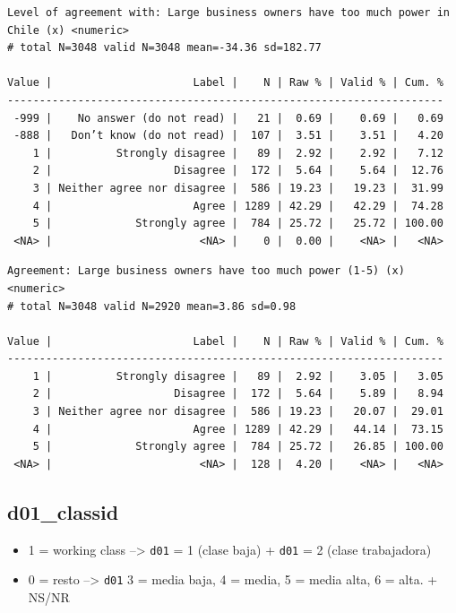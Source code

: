 \documentclass[
  letterpaper,
  DIV=11,
  numbers=noendperiod]{scrreprt}
\newenvironment{Shaded}{\begin{snugshade}}{\end{snugshade}}
\newcommand{\FunctionTok}[1]{\textcolor[rgb]{0.28,0.35,0.67}{#1}}
\newcommand{\NormalTok}[1]{\textcolor[rgb]{0.00,0.23,0.31}{#1}}
\newcommand{\SpecialCharTok}[1]{\textcolor[rgb]{0.37,0.37,0.37}{#1}}
\providecommand{\tightlist}{%
  \setlength{\itemsep}{0pt}\setlength{\parskip}{0pt}}
\begin{document}
\begin{verbatim}
Level of agreement with: Large business owners have too much power in Chile (x) <numeric> 
# total N=3048 valid N=3048 mean=-34.36 sd=182.77

Value |                      Label |    N | Raw % | Valid % | Cum. %
--------------------------------------------------------------------
 -999 |    No answer (do not read) |   21 |  0.69 |    0.69 |   0.69
 -888 |   Don’t know (do not read) |  107 |  3.51 |    3.51 |   4.20
    1 |          Strongly disagree |   89 |  2.92 |    2.92 |   7.12
    2 |                   Disagree |  172 |  5.64 |    5.64 |  12.76
    3 | Neither agree nor disagree |  586 | 19.23 |   19.23 |  31.99
    4 |                      Agree | 1289 | 42.29 |   42.29 |  74.28
    5 |             Strongly agree |  784 | 25.72 |   25.72 | 100.00
 <NA> |                       <NA> |    0 |  0.00 |    <NA> |   <NA>
\end{verbatim}

\begin{Shaded}
\end{Shaded}

\begin{verbatim}
Agreement: Large business owners have too much power (1-5) (x) <numeric> 
# total N=3048 valid N=2920 mean=3.86 sd=0.98

Value |                      Label |    N | Raw % | Valid % | Cum. %
--------------------------------------------------------------------
    1 |          Strongly disagree |   89 |  2.92 |    3.05 |   3.05
    2 |                   Disagree |  172 |  5.64 |    5.89 |   8.94
    3 | Neither agree nor disagree |  586 | 19.23 |   20.07 |  29.01
    4 |                      Agree | 1289 | 42.29 |   44.14 |  73.15
    5 |             Strongly agree |  784 | 25.72 |   26.85 | 100.00
 <NA> |                       <NA> |  128 |  4.20 |    <NA> |   <NA>
\end{verbatim}

\subsection{d01\_classid}\label{d01_classid}

\begin{itemize}
\tightlist
\item
  1 = working class --\textgreater{} \texttt{d01} = 1 (clase baja) +
  \texttt{d01} = 2 (clase trabajadora)
\item
  0 = resto --\textgreater{} \texttt{d01} 3 = media baja, 4 = media, 5 =
  media alta, 6 = alta. + NS/NR
\end{itemize}
\end{document}

